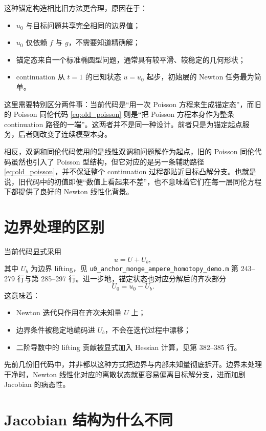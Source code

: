 \documentclass[11pt,a4paper]{article}
\begin{document}
这种锚定构造相比旧方法更合理，原因在于：
\begin{itemize}[leftmargin=2em]
\item $u_0$ 与目标问题共享完全相同的边界值；
\item $u_0$ 仅依赖 $f$ 与 $g$，不需要知道精确解；
\item 锚定态来自一个标准椭圆型问题，通常具有较平滑、较稳定的几何形状；
\item continuation 从 $t=1$ 的已知状态 $u=u_0$ 起步，初始层的 Newton 任务最为简单。
\end{itemize}

这里需要特别区分两件事：当前代码是“用一次 Poisson 方程来生成锚定态”，而旧的 Poisson 同伦代码 \eqref{eq:old_poisson} 则是“把 Poisson 方程本身作为整条 continuation 路径的一端”。这两者并不是同一种设计。前者只是为锚定起点服务，后者则改变了连续模型本身。

相反，双调和同伦代码使用的是线性双调和问题解作为起点，旧的 Poisson 同伦代码虽然也引入了 Poisson 型结构，但它对应的是另一条辅助路径 \eqref{eq:old_poisson}，并不保证整个 continuation 过程都贴近目标凸解分支。也就是说，旧代码中的初值即便“数值上看起来不差”，也不意味着它们在每一层同伦方程下都提供了良好的 Newton 线性化背景。

\section{边界处理的区别}
当前代码显式采用
\begin{equation}
u = U + U_b,
\label{eq:split}
\end{equation}
其中 $U_b$ 为边界 lifting，见 \texttt{u0\_anchor\_monge\_ampere\_homotopy\_demo.m} 第 243--279 行与第 285--297 行。进一步地，锚定状态也对应分解后的齐次部分
\[
U_0 = u_0 - U_b.
\]
这意味着：
\begin{itemize}[leftmargin=2em]
\item Newton 迭代只作用在齐次未知量 $U$ 上；
\item 边界条件被稳定地编码进 $U_b$，不会在迭代过程中漂移；
\item 二阶导数中的 lifting 贡献被显式加入 Hessian 计算，见第 382--385 行。
\end{itemize}

先前几份旧代码中，并非都以这种方式把边界与内部未知量彻底拆开。边界未处理干净时，Newton 线性化对应的离散状态就更容易偏离目标解分支，进而加剧 Jacobian 的病态性。

\section{Jacobian 结构为什么不同}
\end{document}
